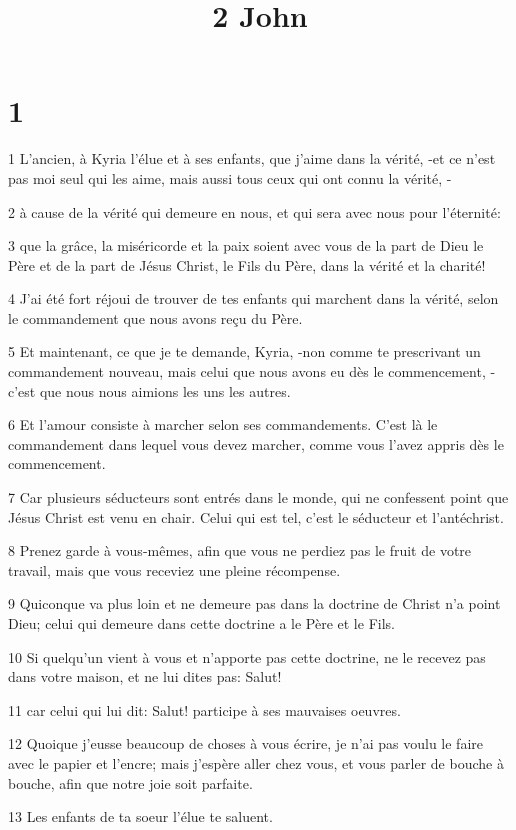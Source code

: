

\title{2 John}


\chapter{1}

\par 1 L'ancien, à Kyria l'élue et à ses enfants, que j'aime dans la vérité, -et ce n'est pas moi seul qui les aime, mais aussi tous ceux qui ont connu la vérité, -
\par 2 à cause de la vérité qui demeure en nous, et qui sera avec nous pour l'éternité:
\par 3 que la grâce, la miséricorde et la paix soient avec vous de la part de Dieu le Père et de la part de Jésus Christ, le Fils du Père, dans la vérité et la charité!
\par 4 J'ai été fort réjoui de trouver de tes enfants qui marchent dans la vérité, selon le commandement que nous avons reçu du Père.
\par 5 Et maintenant, ce que je te demande, Kyria, -non comme te prescrivant un commandement nouveau, mais celui que nous avons eu dès le commencement, -c'est que nous nous aimions les uns les autres.
\par 6 Et l'amour consiste à marcher selon ses commandements. C'est là le commandement dans lequel vous devez marcher, comme vous l'avez appris dès le commencement.
\par 7 Car plusieurs séducteurs sont entrés dans le monde, qui ne confessent point que Jésus Christ est venu en chair. Celui qui est tel, c'est le séducteur et l'antéchrist.
\par 8 Prenez garde à vous-mêmes, afin que vous ne perdiez pas le fruit de votre travail, mais que vous receviez une pleine récompense.
\par 9 Quiconque va plus loin et ne demeure pas dans la doctrine de Christ n'a point Dieu; celui qui demeure dans cette doctrine a le Père et le Fils.
\par 10 Si quelqu'un vient à vous et n'apporte pas cette doctrine, ne le recevez pas dans votre maison, et ne lui dites pas: Salut!
\par 11 car celui qui lui dit: Salut! participe à ses mauvaises oeuvres.
\par 12 Quoique j'eusse beaucoup de choses à vous écrire, je n'ai pas voulu le faire avec le papier et l'encre; mais j'espère aller chez vous, et vous parler de bouche à bouche, afin que notre joie soit parfaite.
\par 13 Les enfants de ta soeur l'élue te saluent.


